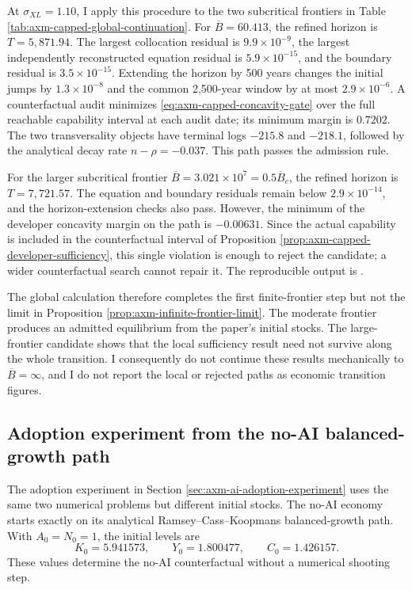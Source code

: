 At \(\sigma_{XL}=1.10\), I apply this procedure to the two subcritical
frontiers in Table \ref{tab:axm-capped-global-continuation}. For
\(\overline B=60.413\), the refined horizon is \(T=5{,}871.94\). The largest
collocation residual is \(9.9\times10^{-9}\), the largest independently
reconstructed equation residual is \(5.9\times10^{-15}\), and the boundary
residual is \(3.5\times10^{-15}\). Extending the horizon by 500 years changes
the initial jumps by \(1.3\times10^{-8}\) and the common 2,500-year window by
at most \(2.9\times10^{-6}\). A counterfactual audit minimizes
\eqref{eq:axm-capped-concavity-gate} over the full reachable capability
interval at each audit date; its minimum margin is \(0.7202\). The two
transversality objects have terminal logs \(-215.8\) and \(-218.1\), followed
by the analytical decay rate \(n-\rho=-0.037\). This path passes the admission
rule.

For the larger subcritical frontier
\(\overline B=3.021\times10^7=0.5\overline B_c\), the refined horizon is
\(T=7{,}721.57\). The equation and boundary residuals remain below
\(2.9\times10^{-14}\), and the horizon-extension checks also pass. However,
the minimum of the developer concavity margin on the path is \(-0.00631\).
Since the actual capability is included in the counterfactual interval of
Proposition \ref{prop:axm-capped-developer-sufficiency}, this single violation
is enough to reject the candidate; a wider counterfactual search cannot repair
it. The reproducible output is
.

The global calculation therefore completes the first finite-frontier step but
not the limit in Proposition \ref{prop:axm-infinite-frontier-limit}. The
moderate frontier produces an admitted equilibrium from the paper's initial
stocks. The large-frontier candidate shows that the local sufficiency result
need not survive along the whole transition. I consequently do not continue
these results mechanically to \(\overline B=\infty\), and I do not report the
local or rejected paths as economic transition figures.

\subsection{Adoption experiment from the no-AI balanced-growth path}
\label{app:axm-ai-adoption-algorithm}

The adoption experiment in Section
\ref{sec:axm-ai-adoption-experiment} uses the same two numerical problems but
different initial stocks. The no-AI economy starts exactly on its analytical
Ramsey--Cass--Koopmans balanced-growth path. With \(A_0=N_0=1\), the initial
levels are
\[
 K_0=5.941573,\qquad Y_0=1.800477,\qquad C_0=1.426157.
\]
These values determine the no-AI counterfactual without a numerical shooting
step.

